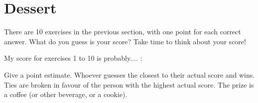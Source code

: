 \documentclass[a4paper]{article}
\begin{document}
\section{Dessert}
\begin{exercise}
  There are 10 exercises in the previous section, with one point for each correct answer. What do you guess is your score? Take time to think about your score!

  My score for exercises 1 to 10 is probably.... :

  Give a point estimate. Whoever guesses the closest to their actual score and wins. Ties are broken in favour of the person with the highest actual score. The prize is a coffee (or other beverage, or a cookie).
\end{exercise}
\end{document}
